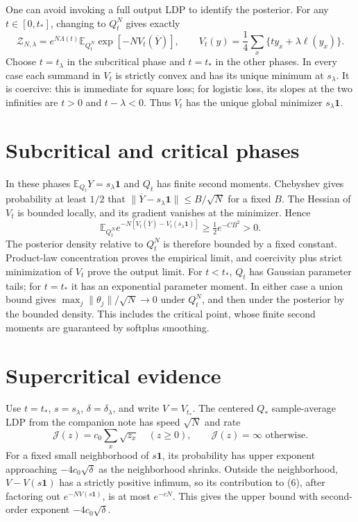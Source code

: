 \documentclass[11pt]{article}
\newcommand{\E}{\mathbb E}\newcommand{\R}{\mathbb R}\newcommand{\one}{\mathbf 1}\newcommand{\Pp}{\mathbb P}
\begin{document}
One can avoid invoking a full output LDP to identify the posterior.
For any $t\in[0,t_*]$, changing to $Q_t^N$ gives exactly
\[
 \mathcal Z_{N,\lambda}
 = e^{N\Lambda(t)}
    \E_{Q_t^N}\exp\left[-N V_t(\overline Y)\right],\qquad
 V_t(y)=\frac14\sum_x\{t y_x+\lambda\ell(y_x)\}.             \tag{6}
\]
Choose $t=t_\lambda$ in the subcritical phase and $t=t_*$
in the other phases. In every case each summand in $V_t$ is strictly
convex and has its unique minimum at $s_\lambda$.
It is coercive: this is immediate for square loss; for logistic loss,
its slopes at the two infinities are $t>0$ and $t-\lambda<0$.
Thus $V_t$ has the unique global minimizer $s_\lambda\one$.

\section{Subcritical and critical phases}
In these phases $\E_{Q_t}Y=s_\lambda\one$ and $Q_t$ has finite
second moments. Chebyshev gives probability at least $1/2$ that
$\|\overline Y-s_\lambda\one\|\le B/\sqrt N$ for a fixed $B$.
The Hessian of $V_t$ is bounded locally, and its gradient vanishes
at the minimizer. Hence
\[
 \E_{Q_t^N}e^{-N[V_t(\overline Y)-V_t(s_\lambda\one)]}
       \ge\tfrac12e^{-CB^2}>0.                              \tag{7}
\]
The posterior density relative to $Q_t^N$ is therefore bounded by
a fixed constant. Product-law concentration proves the empirical
limit, and coercivity plus strict minimization of $V_t$ prove the
output limit. For $t<t_*$, $Q_t$ has Gaussian parameter tails;
for $t=t_*$ it has an exponential parameter moment. In either case
a union bound gives $\max_j\|\theta_j\|/\sqrt N\to0$ under $Q_t^N$,
and then under the posterior by the bounded density. This includes
the critical point, whose finite second moments are guaranteed by
softplus smoothing.

\section{Supercritical evidence}
Use $t=t_*$, $s=s_\lambda$, $\delta=\delta_\lambda$, and write
$V=V_{t_*}$. The centered $Q_*$ sample-average LDP from the companion
note has speed $\sqrt N$ and rate
\[
 \mathcal J(z)=c_0\sum_x\sqrt{z_x}\quad(z\ge0),
 \qquad\mathcal J(z)=\infty\text{ otherwise}.
\]
For a fixed small neighborhood of $s\one$, its probability has
upper exponent approaching $-4c_0\sqrt\delta$ as the neighborhood
shrinks. Outside the neighborhood, $V-V(s\one)$ has a strictly
positive infimum, so its contribution to (6), after factoring out
$e^{-NV(s\one)}$, is at most $e^{-cN}$.
This gives the upper bound with second-order exponent
$-4c_0\sqrt\delta$.
\end{document}

